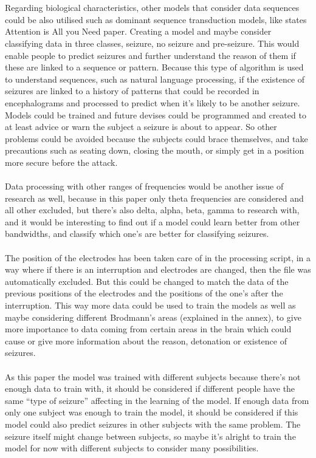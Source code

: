 \\\\
Regarding biological characteristics, other models that consider data sequences could be also utilised such as dominant sequence transduction models, like states Attention is All you Need paper. Creating a model and maybe consider classifying data in three classes, seizure, no seizure and pre-seizure. This would enable people to predict seizures and further understand the reason of them if these are linked to a sequence or pattern. Because this type of algorithm is used to understand sequences, such as natural language processing, if the existence of seizures are linked to a history of patterns that could be recorded in encephalograms and processed to predict when it’s likely to be another seizure. Models could be trained and future devises could be programmed and created to at least advice or warn the subject a seizure is about to appear. So other problems could be avoided because the subjects could brace themselves, and take precautions such as seating down, closing the mouth, or simply get in a position more secure before the attack. 
\\\\
Data processing with other ranges of frequencies would be another issue of research as well, because in this paper only theta frequencies are considered and all other excluded, but there’s also delta, alpha, beta, gamma to research with, and it would be interesting to find out if a model could learn better from other bandwidths, and classify which one’s are better for classifying seizures.
\\\\
The position of the electrodes has been taken care of in the processing script, in a way where if there is an interruption and electrodes are changed, then the file was automatically excluded. But this could be changed to match the data of the previous positions of the electrodes and the positions of the one’s after the interruption. This way more data could be used to train the models as well as maybe considering different Brodmann’s areas (explained in the annex), to give more importance to data coming from certain areas in the brain which could cause or give more information about the reason, detonation or existence of seizures.
\\\\
As this paper the model was trained with different subjects because there’s not enough data to train with, it should be considered if different people have the same “type of seizure” affecting in the learning of the model. If enough data from only one subject was enough to train the model, it should be considered if this model could also predict seizures in other subjects with the same problem. The seizure itself might change between subjects, so maybe it’s alright to train the model for now with different subjects to consider many possibilities. 
